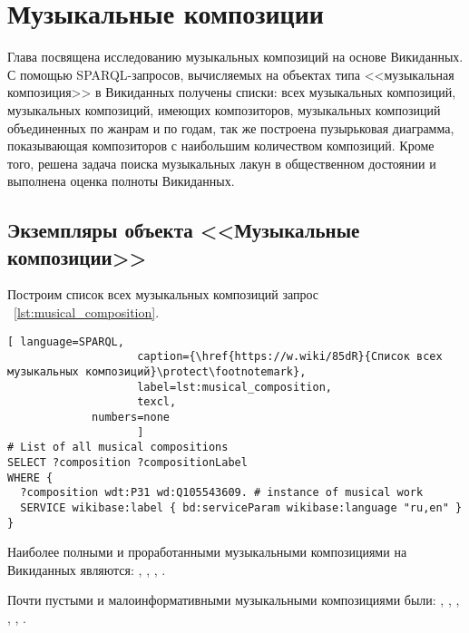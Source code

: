 \chapter{Музыкальные композиции}
\label{ch:musical-composition}
Глава посвящена исследованию музыкальных композиций на основе Викиданных. С помощью SPARQL-запросов, вычисляемых на объектах типа <<музыкальная композиция>> в Викиданных получены списки: всех музыкальных композиций, музыкальных композиций, имеющих композиторов, музыкальных композиций объединенных по жанрам и по годам, так же построена пузырьковая диаграмма, показывающая композиторов с наибольшим количеством композиций. Кроме того, решена задача поиска музыкальных лакун в общественном достоянии и выполнена оценка полноты Викиданных.

\section{Экземпляры объекта <<Музыкальные композиции>>}


Построим список всех музыкальных композиций запрос ~\ref{lst:musical_composition}.

\begin{lstlisting}[ language=SPARQL,
                    caption={\href{https://w.wiki/85dR}{Список всех  музыкальных композиций}\protect\footnotemark},
                    label=lst:musical_composition,
                    texcl,
	         numbers=none
                    ]
# List of all musical compositions
SELECT ?composition ?compositionLabel 
WHERE {
  ?composition wdt:P31 wd:Q105543609. # instance of musical work
  SERVICE wikibase:label { bd:serviceParam wikibase:language "ru,en" }
}
\end{lstlisting}%

Наиболее полными и проработанными музыкальными композициями на Викиданных являются: , , , .

Почти пустыми и малоинформативными музыкальными композициями были: , , , , , .

